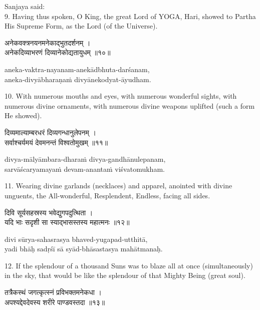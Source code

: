 Sanjaya said: \\
9. Having thus spoken, O King, the great Lord of YOGA, Hari, showed to Partha
His Supreme Form, as the Lord (of the Universe).

\begin{gitaverse}
अनेकवक्त्रनयनमनेकाद्भुतदर्शनम् । \\
अनेकदिव्याभरणं दिव्यानेकोद्यतायुधम् ॥१०॥
\end{gitaverse}

\begin{transliteration}
aneka-vaktra-nayanam-anekādbhuta-darśanam, \\
aneka-divyābharaṇaṁ divyānekodyat-āyudham.
\end{transliteration}

10. With numerous mouths and eyes, with numerous wonderful sights, with
numerous divine ornaments, with numerous divine weapons uplifted (such a form
He showed).

\begin{gitaverse}
दिव्यमाल्याम्बरधरं दिव्यगन्धानुलेपनम् । \\
सर्वाश्चर्यमयं देवमनन्तं विश्वतोमुखम् ॥११॥
\end{gitaverse}

\begin{transliteration}
divya-mālyāmbara-dharaṁ divya-gandhānulepanam, \\
sarvāścaryamayaṁ devam-anantaṁ viśvatomukham.
\end{transliteration}

11. Wearing divine garlands (necklaces) and apparel, anointed with divine
unguents, the All-wonderful, Resplendent, Endless, facing all sides.

\begin{gitaverse}
दिवि सूर्यसहस्रस्य भवेद्युगपदुत्थिता । \\
यदि भाः सदृशी सा स्याद्भासस्तस्य महात्मनः ॥१२॥
\end{gitaverse}

\begin{transliteration}
divi sūrya-sahasrasya bhaved-yugapad-utthitā, \\
yadi bhāḥ sadṛśī sā syād-bhāsastasya mahātmanaḥ.
\end{transliteration}

12. If the splendour of a thousand Suns was to blaze all at once
(simultaneously) in the sky, that would be like the splendour of that Mighty
Being (great soul).

\begin{gitaverse}
तत्रैकस्थं जगत्कृत्स्नं प्रविभक्तमनेकधा । \\
अपश्यद्देवदेवस्य शरीरे पाण्डवस्तदा ॥१३॥
\end{gitaverse}

